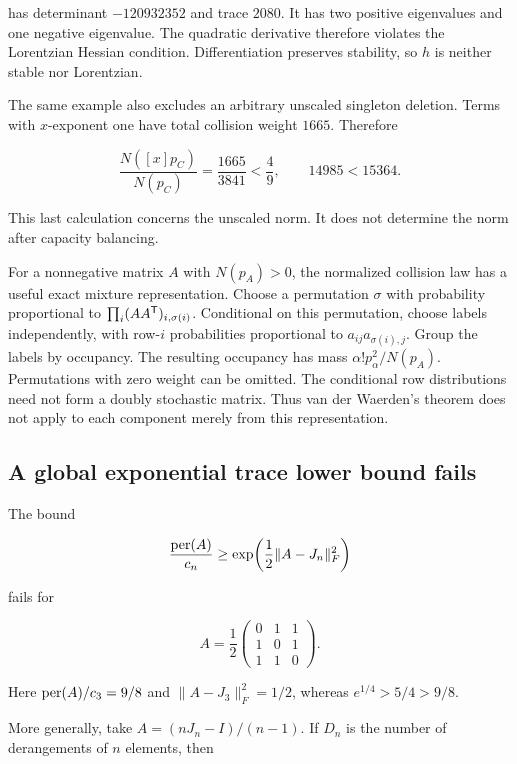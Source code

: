 has determinant \(-120932352\) and trace \(2080\). It has two positive eigenvalues and one negative eigenvalue. The quadratic derivative therefore violates the Lorentzian Hessian condition. Differentiation preserves stability, so \(h\) is neither stable nor Lorentzian.

The same example also excludes an arbitrary unscaled singleton deletion. Terms with \(x\)-exponent one have total collision weight \(1665\). Therefore

\[
\frac{N([x]p_C)}{N(p_C)}=\frac{1665}{3841}<\frac49,
\qquad 14985<15364.
\]

This last calculation concerns the unscaled norm. It does not determine the norm after capacity balancing.

For a nonnegative matrix \(A\) with \(N(p_A)>0\), the normalized collision law has a useful exact mixture representation. Choose a permutation \(\sigma\) with probability proportional to \(\prod_i(AA^{\mathsf{T}})_{i,\sigma(i)}\). Conditional on this permutation, choose labels independently, with row-\(i\) probabilities proportional to \(a_{ij}a_{\sigma(i),j}\). Group the labels by occupancy. The resulting occupancy has mass \(\alpha!p_\alpha^2/N(p_A)\). Permutations with zero weight can be omitted. The conditional row distributions need not form a doubly stochastic matrix. Thus van der Waerden's theorem does not apply to each component merely from this representation.

\subsection{A global exponential trace lower bound fails}\label{app:additional-6}

The bound

\begin{equation}
\frac{\operatorname{per}(A)}{c_n}
\ge\exp\!\left(\frac12\|A-J_n\|_F^2\right)
\label{eq:additional-2}
\end{equation}

fails for

\[
A=\frac12\begin{pmatrix}0&1&1\\1&0&1\\1&1&0\end{pmatrix}.
\]

Here \(\operatorname{per}(A)/c_3=9/8\) and \(\|A-J_3\|_F^2=1/2\), whereas \(e^{1/4}>5/4>9/8\).

More generally, take \(A=(nJ_n-I)/(n-1)\). If \(D_n\) is the number of derangements of \(n\) elements, then

